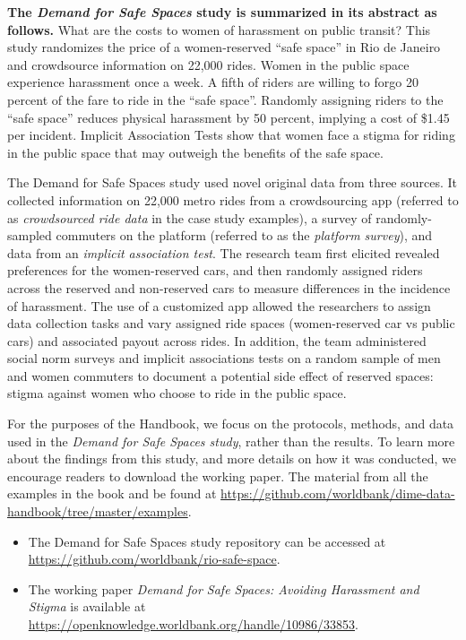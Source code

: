 \documentclass[]{tufte-book}
\begin{document}
\textbf{The \emph{Demand for Safe Spaces} study is summarized in its
abstract as follows.} What are the costs to women of harassment on
public transit? This study randomizes the price of a women-reserved
``safe space'' in Rio de Janeiro and crowdsource information on 22,000
rides. Women in the public space experience harassment once a week. A
fifth of riders are willing to forgo 20 percent of the fare to ride in
the ``safe space''. Randomly assigning riders to the ``safe space''
reduces physical harassment by 50 percent, implying a cost of \$1.45 per
incident. Implicit Association Tests show that women face a stigma for
riding in the public space that may outweigh the benefits of the safe
space.

The Demand for Safe Spaces study used novel original data from three
sources. It collected information on 22,000 metro rides from a
crowdsourcing app (referred to as \emph{crowdsourced ride data} in the
case study examples), a survey of randomly-sampled commuters on the
platform (referred to as the \emph{platform survey}), and data from an
\emph{implicit association test}. The research team first elicited
revealed preferences for the women-reserved cars, and then randomly
assigned riders across the reserved and non-reserved cars to measure
differences in the incidence of harassment. The use of a customized app
allowed the researchers to assign data collection tasks and vary
assigned ride spaces (women-reserved car vs public cars) and associated
payout across rides. In addition, the team administered social norm
surveys and implicit associations tests on a random sample of men and
women commuters to document a potential side eﬀect of reserved spaces:
stigma against women who choose to ride in the public space.

For the purposes of the Handbook, we focus on the protocols, methods,
and data used in the \emph{Demand for Safe Spaces study}, rather than
the results. To learn more about the findings from this study, and more
details on how it was conducted, we encourage readers to download the
working paper. The material from all the examples in the book and be
found at
\url{https://github.com/worldbank/dime-data-handbook/tree/master/examples}.

\begin{itemize}
\item
  The Demand for Safe Spaces study repository can be accessed at
  \url{https://github.com/worldbank/rio-safe-space}.
\item
  The working paper \emph{Demand for Safe Spaces: Avoiding Harassment
  and Stigma} is available at
  \url{https://openknowledge.worldbank.org/handle/10986/33853}.
\end{itemize}
\end{document}

